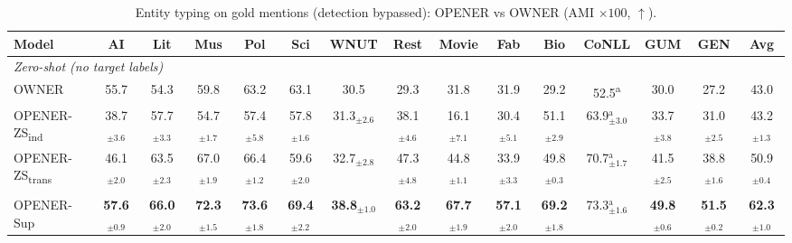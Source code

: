 \documentclass[pdflatex,sn-basic,Numbered]{sn-jnl}
\newcommand{\zstr}{OPENER-ZS\textsubscript{trans}}
\newcommand{\zsind}{OPENER-ZS\textsubscript{ind}}
\begin{document}
\begin{table}[!t]
\centering
\caption{Entity typing on gold mentions (detection bypassed): OPENER vs OWNER (AMI $\times 100$, $\uparrow$).}
\label{tab:et-gold}
\scriptsize
\setlength{\tabcolsep}{2.5pt}
\begin{adjustbox}{max width=\textwidth}
\begin{threeparttable}
\begin{tabular}{l*{13}{c}c}
\toprule
Model & AI & Lit & Mus & Pol & Sci & WNUT & Rest & Movie & Fab & Bio & CoNLL & GUM & GEN & Avg \\
\midrule
\multicolumn{15}{l}{\emph{Zero-shot (no target labels)}} \\
OWNER & 55.7 & 54.3 & 59.8 & 63.2 & 63.1 & 30.5 & 29.3 & 31.8 & 31.9 & 29.2 & 52.5\textsuperscript{a} & 30.0 & 27.2 & 43.0 \\
\zsind & 38.7$_{\pm3.6}$ & 57.7$_{\pm3.3}$ & 54.7$_{\pm1.7}$ & 57.4$_{\pm5.8}$ & 57.8$_{\pm1.6}$ & 31.3$_{\pm2.6}$ & 38.1$_{\pm4.6}$ & 16.1$_{\pm7.1}$ & 30.4$_{\pm5.1}$ & 51.1$_{\pm2.9}$ & 63.9$_{\pm3.0}^{\text{a}}$ & 33.7$_{\pm3.8}$ & 31.0$_{\pm2.5}$ & 43.2$_{\pm1.3}$ \\
\rowcolor{hlyellow} \zstr & 46.1$_{\pm2.0}$ & 63.5$_{\pm2.3}$ & 67.0$_{\pm1.9}$ & 66.4$_{\pm1.2}$ & 59.6$_{\pm2.0}$ & 32.7$_{\pm2.8}$ & 47.3$_{\pm4.8}$ & 44.8$_{\pm1.1}$ & 33.9$_{\pm3.3}$ & 49.8$_{\pm0.3}$ & 70.7$_{\pm1.7}^{\text{a}}$ & 41.5$_{\pm2.5}$ & 38.8$_{\pm1.6}$ & 50.9$_{\pm0.4}$ \\
\addlinespace
\multicolumn{15}{l}{\emph{Supervised (target labels)}} \\
\rowcolor{hlred} OPENER-Sup & \textbf{57.6$_{\pm0.9}$} & \textbf{66.0$_{\pm2.0}$} & \textbf{72.3$_{\pm1.5}$} & \textbf{73.6$_{\pm1.8}$} & \textbf{69.4$_{\pm2.2}$} & \textbf{38.8$_{\pm1.0}$} & \textbf{63.2$_{\pm2.0}$} & \textbf{67.7$_{\pm1.9}$} & \textbf{57.1$_{\pm2.0}$} & \textbf{69.2$_{\pm1.8}$} & 73.3$_{\pm1.6}^{\text{a}}$ & \textbf{49.8$_{\pm0.6}$} & \textbf{51.5$_{\pm0.2}$} & \textbf{62.3$_{\pm1.0}$} \\

\end{tabular}
\end{threeparttable}
\end{adjustbox}
\end{table}
\end{document}
